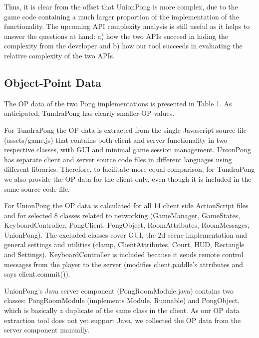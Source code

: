 \documentclass[conference]{IEEEtran}
\begin{document}
Thus, it is clear from the offset that UnionPong is more complex, due
to the game code containing a much larger proportion of the
implementation of the functionality. The upcoming API complexity
analysis is still useful as it helps to answer the questions at
hand: a) how the two APIs succeed in hiding the complexity from the
developer and b) how our tool succeeds in evaluating the relative
complexity of the two APIs.


\subsection{Object-Point Data%
  \label{object-point-data}%
}

The OP data of the two Pong implementations is presented in
Table 1. As anticipated, TundraPong has clearly smaller OP values.

For TundraPong the OP data is extracted from the single Javascript
source file (assets/game.js) that contains both client and server
functionality in two respective classes, with GUI and minimal game
session management. UnionPong has separate client and server source
code files in different languages using different
libraries. Therefore, to facilitate more equal comparison, for
TundraPong we also provide the OP data for the client only, even
though it is included in the same source code file.

For UnionPong the OP data is calculated for all 14 client side
ActionScript files and for selected 8 classes related to networking
(GameManager, GameStates, KeyboardController, PongClient, PongObject,
RoomAttributes, RoomMessages, UnionPong). The excluded classes cover
GUI, the 2d scene implementation and general settings and utilities
(clamp, ClientAttributes, Court, HUD, Rectangle and
Settings). KeyboardController is included because it sends remote
control messages from the player to the server (modifies
client.paddle's attributes and says client.commit()).

UnionPong’s Java server component (PongRoomModule.java) contains two
classes: PongRoomModule (implements Module, Runnable) and PongObject,
which is basically a duplicate of the same class in the client. As our
OP data extraction tool does not yet support Java, we collected the OP
data from the server component manually.
\end{document}
